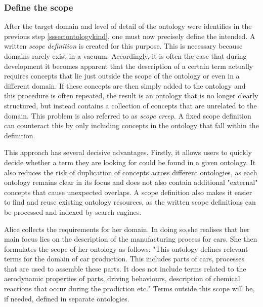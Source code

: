 \subsubsection{Define the scope}


After the target domain and level of detail of the ontology were identifies in the previous step \ref{sssec:ontologykind}, one must now precisely define the intended. A written \textit{scope definition} is created for this purpose. This is necessary because domains rarely exist in a vacuum. Accordingly, it is often the case that during development it becomes apparent that the description of a certain term actually requires concepts that lie just outside the scope of the ontology or even in a different domain. If these concepts are then simply added to the ontology and this procedure is often repeated, the result is an ontology that is no longer clearly structured, but instead contains a collection of concepts that are unrelated to the domain. This problem is also referred to as \textit{scope creep}. A fixed scope definition can counteract this by only including concepts in the ontology that fall within the definition.

This approach has several decisive advantages. Firstly, it allows users to quickly decide whether a term they are looking for could be found in a given ontology. It also reduces the risk of duplication of concepts across different ontologies, as each ontology remains clear in its focus and does not also contain additional "external" concepts that cause unexpected overlaps. A scope definition also makes it easier to find and reuse existing ontology resources, as the written scope definitions can be processed and indexed by search engines.

\begin{example}

Alice collects the requirements for her domain. In doing so,she realises that her main focus lies on the description of the manufacturing process for cars. She then formulates the scope of her ontology as follows: "This ontology defines relevant terms for the domain of car production. This includes parts of cars, processes that are used to assemble these parts. It does not include terms related to the aerodynamic properties of parts, driving behaviours, description of chemical reactions that occur during the prodiction etc." Terms outside this scope will be, if needed, defined in separate ontologies.

\end{example}

